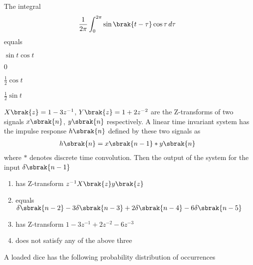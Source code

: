 \iffalse
\author{EE24BTECH11049}
\section{ee}
\chapter{2007}
\fi

    \item 
    The integral 
    \begin{align*}
        \frac{1}{2\pi} \int_0^{2\pi} \sin{\brak{t-\tau}}\cos{\tau}\, d\tau
    \end{align*}
    equals
    \hfill{}
    \begin{enumerate}
    \begin{multicols}{4}
        \item $\sin{t}\cos{t}$
        \item $0$
        \item $\frac{1}{2}\cos{t}$
        \item $\frac{1}{2}\sin{t}$
    \end{multicols}
    \end{enumerate}

    \item 
    $X\brak{z} = 1 - 3z^{-1}$, $Y\brak{z} = 1 + 2z^{-2}$ are the Z-transforms of two signals $x\sbrak{n}$, $y\sbrak{n}$ respectively. A linear time invariant system has the impulse response $h\sbrak{n}$ defined by these two signals as 
    \begin{align*}
        h\sbrak{n} = x\sbrak{n-1} * y\sbrak{n}
    \end{align*}	
    where $*$ denotes discrete time convolution. Then the output of the system for the input $\delta\sbrak{n-1}$
    \hfill{}
    \begin{enumerate}
        \item has Z-transform $z^{-1}X\brak{z}y\brak{z}$
        \item equals $\delta\sbrak{n - 2} - 3\delta\sbrak{n - 3} + 2\delta\sbrak{n - 4} - 6\delta\sbrak{n - 5}$
        \item has Z-transform $1 - 3z^{-1} + 2z^{-2} - 6z^{-3} $ 
        \item does not satisfy any of the above three
    \end{enumerate}

    \item 
    A loaded dice has the following probability distribution of occurrences

